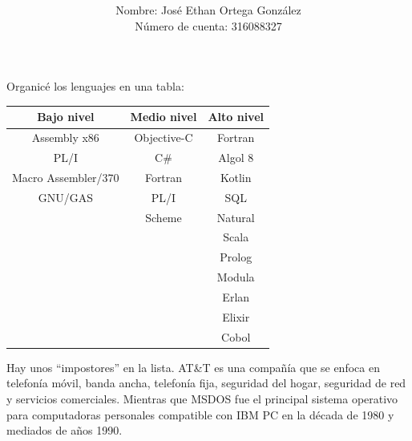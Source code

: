 \documentclass[answers]{exam}
\title{
  \huge \materia{} \\[0.5cm]
  \LARGE \tarea{}
}
\author{
  Nombre: José Ethan Ortega González \\
  Número de cuenta: 316088327
}
\begin{document}
\maketitle{}
\thispagestyle{headandfoot}
\begin{questions}
  \begin{solution}
    Organicé los lenguajes en una tabla:
    \begin{center}
      \begin{tabular}{|c|c|c|}
        \hline
        Bajo nivel          & Medio nivel & Alto nivel \\
        \hline
        Assembly x86        & Objective-C & Fortran \\
        PL/I                & C\#         & Algol 8 \\
        Macro Assembler/370 & Fortran     & Kotlin \\
        GNU/GAS             & PL/I        & SQL \\
                            & Scheme      & Natural \\
                            &             & Scala \\
                            &             & Prolog \\
                            &             & Modula \\
                            &             & Erlan \\
                            &             & Elixir \\
                            &             & Cobol \\
        \hline
      \end{tabular}
    \end{center}
    Hay unos ``impostores'' en la lista. AT\&T es una compañía que se enfoca en
    telefonía móvil, banda ancha, telefonía fija, seguridad del hogar, seguridad
    de red y servicios comerciales. Mientras que MSDOS fue el principal sistema
    operativo para computadoras personales compatible con IBM PC en la década de
    1980 y mediados de años 1990.
  \end{solution}


\end{questions}
\end{document}
